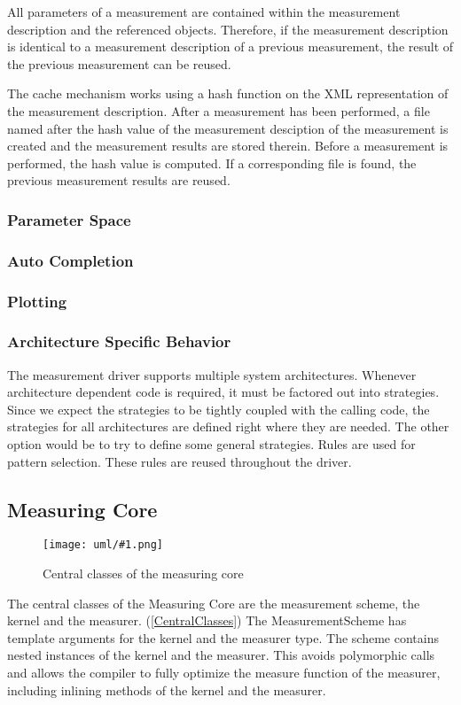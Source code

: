 \documentclass[a4paper,12pt]{article}
\newcommand{\umlDiagram}[1]{\begin{center}\texttt{[image: uml/\#1.png]}\end{center}}
\newcommand{\umlFloat}[2]{
\begin{figure}[tbh]
\umlDiagram{#1}
\caption{#2}
\label{#1}
\end{figure}
}
\newcommand{\umlRef}[1]{\autoref{#1}}
\begin{document}
All parameters of a measurement are contained within the measurement description and the referenced objects. Therefore, if the measurement description is identical to a measurement description of a previous measurement, the result of the previous measurement can be reused. 

The cache mechanism works using a hash function on the XML representation of the measurement description. After a measurement has been performed, a file named after the hash value of the measurement desciption of the measurement is created and the measurement results are stored therein. Before a measurement is performed, the hash value is computed. If a corresponding file is found, the previous measurement results are reused.

\subsubsection{Parameter Space}

\subsubsection{Auto Completion}

\subsubsection{Plotting}

\subsubsection{Architecture Specific Behavior}
The measurement driver supports multiple system architectures. Whenever architecture dependent code is required, it must be factored out into strategies. Since we expect the strategies to be tightly coupled with the calling code, the strategies for all architectures are defined right where they are needed. The other option would be to try to define some general strategies. Rules are used for pattern selection. These rules are reused throughout the driver.

\subsection{Measuring Core}
\umlFloat{CentralClasses}{Central classes of the measuring core}
The central classes of the Measuring Core are the measurement scheme, the kernel and the measurer. (\umlRef{CentralClasses}) The MeasurementScheme has template arguments for the kernel and the measurer type. The scheme contains nested instances of the kernel and the measurer. This avoids polymorphic calls and allows the compiler to fully optimize the measure function of the measurer, including inlining methods of the kernel and the measurer.
\end{document}
